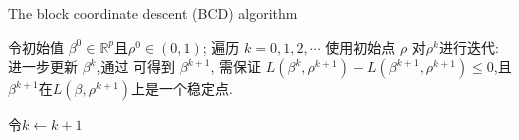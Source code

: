 \documentclass{beamer}
\begin{document}
\begin{frame}[fragile]

\begin{algorithm}[H]
\caption{The block coordinate descent (BCD) algorithm }
\label{alg-main}

\begin{algorithmic}[1]
\STATE     令初始值   $\beta^0 \in \mathbb{R}^{p}$且$\rho^0 \in (0,1) $;  %
\STATE 遍历 $k = 0,1,2,\cdots$
\STATE %
使用初始点 $\rho$ 对$\rho^k$进行迭代:
\STATE %
 进一步更新 $ \beta^k$,通过
可得到 $ \beta^{k+1}$, 需保证
    $L(\beta^{k},\rho^{k+1}) - L(\beta^{k+1},\rho^{k+1}) \leq 0$,且
    $\beta^{k+1}$在$L(\beta ,\rho^{k+1})$上是一个稳定点.

\STATE     令$k\leftarrow k+1$

\end{algorithmic}
\end{algorithm}


\end{frame}
\end{document}

